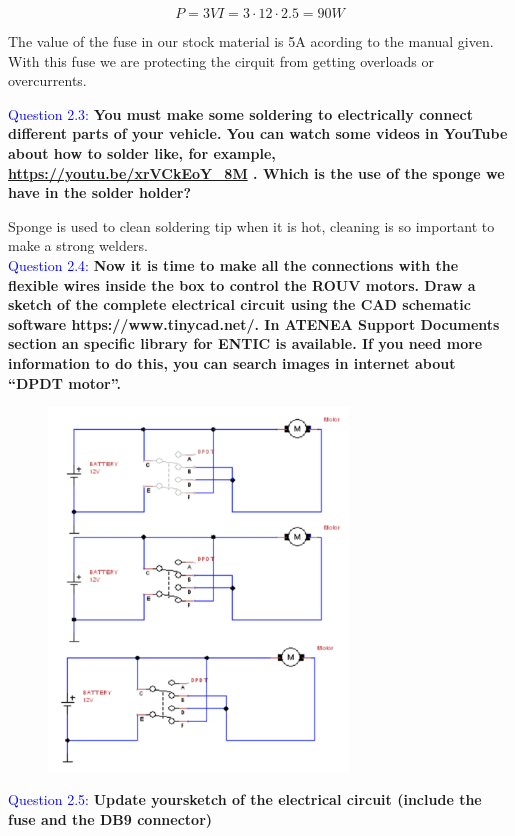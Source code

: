\documentclass[12pt, a4papre]{article}
\begin{document}
	\[
		P = 3VI = 3\cdot12\cdot 2.5 = 90W
	\]
	
	The value of the fuse in our stock material is 5A acording to the manual given. With this fuse we are protecting the cirquit from getting overloads or overcurrents.

	\textcolor{blue}{Question 2.3:} \textbf{You must make some soldering to electrically connect different parts of your vehicle. You can watch some videos in YouTube about how to solder like, for example, \url{https://youtu.be/xrVCkEoY_8M} . Which is the use of the sponge we have in the solder holder?}
	
	Sponge is used to clean soldering tip when it is hot, cleaning is so important to make a strong welders.\\
	\newpage
	\textcolor{blue}{Question 2.4:} \textbf{Now it is time to make all the connections with the flexible wires inside the box to control the ROUV motors. Draw a sketch of the complete electrical circuit using the CAD schematic software https://www.tinycad.net/. In ATENEA Support Documents section an specific library for ENTIC is available. If you need more information to do this, you can search images in internet about “DPDT motor”.}
	
	\begin{figure}[H]
		\begin{center}
		\includegraphics[width=80mm]{Cirquit1WP2.png}
		\end{center}
	\end{figure}
	
	\newpage
	\textcolor{blue}{Question 2.5:} \textbf{Update yoursketch of the electrical circuit (include the fuse and the DB9 connector)}
	
\end{document}
